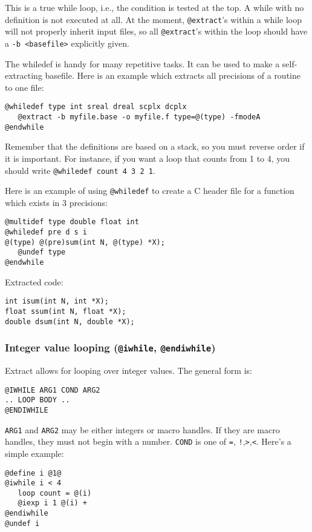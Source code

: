 This is a true while loop, i.e., the condition is tested at the top.  A
while with no definition is not executed at all.  At the moment,
{\tt @extract}'s within a while loop will not properly inherit input
files, so all {\tt @extract}'s within the loop should have a 
{\tt -b <basefile>} explicitly given.

The whiledef is handy for many repetitive tasks.  It can be used to make
a self-extracting basefile.
Here is an example which extracts all precisions of a routine to one file:
\begin{verbatim}
@whiledef type int sreal dreal scplx dcplx
   @extract -b myfile.base -o myfile.f type=@(type) -fmodeA
@endwhile
\end{verbatim}

Remember that the definitions are based on a stack, so you
must reverse order if it is important.  For instance, if you want
a loop that counts from 1 to 4, you should write 
{\tt @whiledef count 4 3 2 1}.

\noindent
Here is an example of using {\tt @whiledef} to create a C header file for
a function which exists in 3 precisions:
\begin{verbatim}
@multidef type double float int
@whiledef pre d s i
@(type) @(pre)sum(int N, @(type) *X);
   @undef type
@endwhile
\end{verbatim}

\noindent
Extracted code:
\begin{verbatim}
int isum(int N, int *X);
float ssum(int N, float *X);
double dsum(int N, double *X);
\end{verbatim}

\subsubsection{Integer value looping ({\tt @iwhile}, {\tt @endiwhile})}
\label{sec-iwhile}
Extract allows for looping over integer values.  The general form is:
\begin{verbatim}
@IWHILE ARG1 COND ARG2
.. LOOP BODY ..
@ENDIWHILE
\end{verbatim}

{\tt ARG1} and {\tt ARG2} may be either integers or macro handles.  If they
are macro handles, they must not begin with a number.  {\tt COND} is one of
\verb+=+, \verb+!+,\verb+>+,\verb+<+.
Here's a simple example:
\begin{verbatim}
@define i @1@
@iwhile i < 4
   loop count = @(i)
   @iexp i 1 @(i) +
@endiwhile
@undef i
\end{verbatim}

